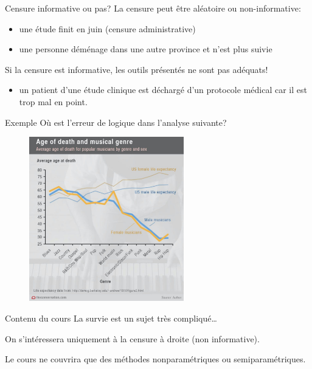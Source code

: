 \documentclass[
  ignorenonframetext,
]{beamer}
\providecommand{\tightlist}{%
  \setlength{\itemsep}{0pt}\setlength{\parskip}{0pt}}\usepackage{longtable,booktabs,array}
\begin{document}
\begin{frame}{Censure informative ou pas?}
\protect\hypertarget{censure-informative-ou-pas}{}
La censure peut être aléatoire ou non-informative:

\begin{itemize}
\tightlist
\item
  une étude finit en juin (censure administrative)
\item
  une personne déménage dans une autre province et n'est plus suivie
\end{itemize}

Si la censure est informative, les outils présentés ne sont pas
adéquats!

\begin{itemize}
\tightlist
\item
  un patient d'une étude clinique est déchargé d'un protocole médical
  car il est trop mal en point.
\end{itemize}
\end{frame}

\begin{frame}{Exemple}
\protect\hypertarget{exemple}{}
Où est l'erreur de logique dans l'analyse suivante?

\begin{figure}

{\centering \includegraphics[width=0.6\textwidth,height=\textheight]{figures/rightcensoring_illustration-age_death_music_genre.jpg}

}

\end{figure}
\end{frame}

\begin{frame}{Contenu du cours}
\protect\hypertarget{contenu-du-cours}{}
La survie est un sujet très compliqué\ldots{}

On s'intéressera uniquement à la censure à droite (non informative).

Le cours ne couvrira que des méthodes nonparamétriques ou
semiparamétriques.
\end{frame}
\end{document}
